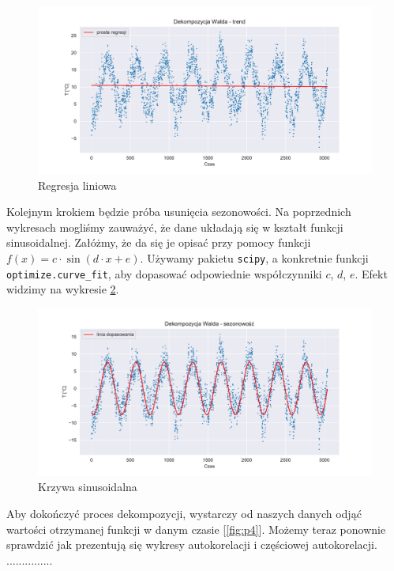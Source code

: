 \documentclass{article}
\theoremstyle{break}
\newcommand{\code}[1]{\colorbox{light-gray}{\texttt{#1}}}
\begin{document}
\begin{figure}[H]
	\begin{center}
		\includegraphics[scale=0.63]{plot2.pdf}
		\caption{Regresja liniowa}
		\label{fig:p2}
	\end{center}
\end{figure}

Kolejnym krokiem będzie próba usunięcia sezonowości. Na poprzednich wykresach mogliśmy zauważyć, że dane układają się w kształt funkcji sinusoidalnej. Załóżmy, że da się je opisać przy pomocy funkcji $f(x) = c\cdot\sin(d\cdot x+e)$. Używamy pakietu \code{scipy}, a konkretnie funkcji \code{optimize.curve\_fit}, aby dopasować odpowiednie współczynniki $c$, $d$, $e$. Efekt widzimy na wykresie \ref{fig:p3}.

\begin{figure}[H]
	\begin{center}
		\includegraphics[scale=0.63]{plot3.pdf}
		\caption{Krzywa sinusoidalna}
		\label{fig:p3}
	\end{center}
\end{figure}

Aby dokończyć proces dekompozycji, wystarczy od naszych danych odjąć wartości otrzymanej funkcji w danym czasie [\ref{fig:p4}]. Możemy teraz ponownie sprawdzić jak prezentują się wykresy autokorelacji i częściowej autokorelacji. ...............
\end{document}
